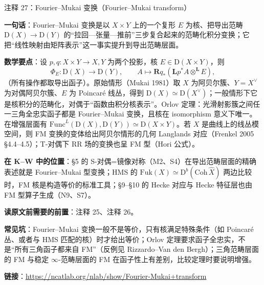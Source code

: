 \begin{kcard}{注释 27：Fourier--Mukai 变换（Fourier--Mukai transform）}

\textbf{一句话}：Fourier--Mukai 变换是以 $X\times Y$ 上的一个复形 $E$ 为核、把导出范畴 $\mathrm D(X)\to\mathrm D(Y)$ 的“拉回---张量---推前”三步复合起来的范畴化积分变换；它把“线性映射由矩阵表示”这一事实提升到导出范畴层面。

\textbf{数学要点}：设 $p,q:X\times Y\to X,Y$ 为两个投影，核 $E\in\mathrm D(X\times Y)$，则
\[
\Phi_E:\mathrm D(X)\longrightarrow \mathrm D(Y),\qquad
A\longmapsto \mathbf R q_*\!\left(\mathbf L p^*A\otimes^{\mathbf L}E\right),
\]
（所有操作都取导出函子）。原始情形（Mukai 1981）取 $X$ 为阿贝尔簇、$Y=X^\vee$ 为对偶阿贝尔簇、$E$ 为 Poincaré 线丛，得到 $\mathrm D(X)\simeq\mathrm D(X^\vee)$；一般情形下它是核积分的范畴化，对偶于“函数由积分核表示”。Orlov 定理：光滑射影簇之间任一三角全忠实函子都是 Fourier--Mukai 变换，且核在 isomorphism 意义下唯一。在增强层面有 $\mathrm{Func}^L(\mathrm D(X),\mathrm D(Y))\simeq \mathrm D(X\times Y)$。若 $X$ 是曲线上的线丛模空间，则 FM 变换的变体给出阿贝尔情形的几何 Langlands 对应（Frenkel 2005 §4.4--4.5）；T-对偶下 RR 场的变换也呈 FM 型（Hori 公式）。

\textbf{在 K--W 中的位置}：§5 的 S-对偶=镜像对称（M2、S4）在导出范畴层面的精确表述就是 Fourier--Mukai 型变换；HMS 的 $\mathrm{Fuk}(X)\simeq \mathrm D^b(\mathrm{Coh}\,\hat X)$ 两边比较时，FM 核是构造等价的标准工具；§9--§10 的 Hecke 对应与 Hecke 特征层也由 FM 型算子生成（N9、S7）。

\textbf{读原文前需要的前置}：注释 25、注释 26。

\textbf{常见坑}：Fourier--Mukai 变换一般不是等价，只有核满足特殊条件（如 Poincaré 丛、或者与 HMS 匹配的核）时才给出等价；Orlov 定理要求函子全忠实，不是“所有三角函子都来自 FM”（反例见 Rizzardo--Van den Bergh）；三角范畴层面的 FM 与稳定 $\infty$-范畴层面的 FM 在函子性上有差别，比较定理时要说明增强。

\noindent\textbf{链接}：\url{https://ncatlab.org/nlab/show/Fourier-Mukai+transform}
\end{kcard}

